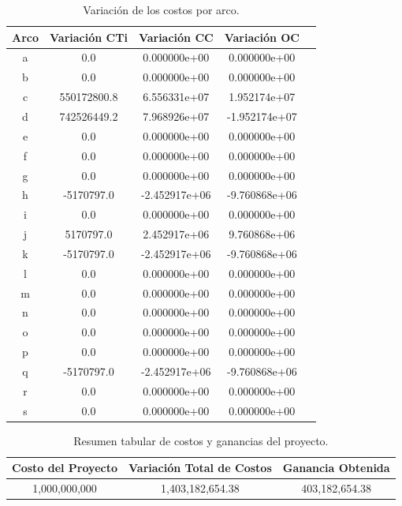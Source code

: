 \documentclass[letterpaper,12pt]{article}
\begin{document}
\begin{table}[H]
    \centering
    \begin{tabular}{ccccc}
        \toprule
        \textbf{Arco} & \textbf{Variación CTi} & \textbf{Variación CC} & \textbf{Variación OC} \\
        \midrule
        a & 0.0         & 0.000000e+00 & 0.000000e+00 \\
        b & 0.0         & 0.000000e+00 & 0.000000e+00 \\
        c & 550172800.8 & 6.556331e+07 & 1.952174e+07 \\
        d & 742526449.2 & 7.968926e+07 & -1.952174e+07 \\
        e & 0.0         & 0.000000e+00 & 0.000000e+00 \\
        f & 0.0         & 0.000000e+00 & 0.000000e+00 \\
        g & 0.0         & 0.000000e+00 & 0.000000e+00 \\
        h & -5170797.0  & -2.452917e+06 & -9.760868e+06 \\
        i & 0.0         & 0.000000e+00 & 0.000000e+00 \\
        j & 5170797.0   & 2.452917e+06 & 9.760868e+06 \\
        k & -5170797.0  & -2.452917e+06 & -9.760868e+06 \\
        l & 0.0         & 0.000000e+00 & 0.000000e+00 \\
        m & 0.0         & 0.000000e+00 & 0.000000e+00 \\
        n & 0.0         & 0.000000e+00 & 0.000000e+00 \\
        o & 0.0         & 0.000000e+00 & 0.000000e+00 \\
        p & 0.0         & 0.000000e+00 & 0.000000e+00 \\
        q & -5170797.0  & -2.452917e+06 & -9.760868e+06 \\
        r & 0.0         & 0.000000e+00 & 0.000000e+00 \\
        s & 0.0         & 0.000000e+00 & 0.000000e+00 \\
        \bottomrule
    \end{tabular}
    \caption{Variación de los costos por arco.}
    \label{tab:variacion_costos}
\end{table}


\begin{table}[H]
    \centering
    \begin{tabular}{ccc}
        \toprule
        \textbf{Costo del Proyecto} & \textbf{Variación Total de Costos} & \textbf{Ganancia Obtenida} \\
        \midrule
        1,000,000,000 & 1,403,182,654.38 & 403,182,654.38 \\
        \bottomrule
    \end{tabular}
    \caption{Resumen tabular de costos y ganancias del proyecto.}
    \label{tab:resumen_costos}
\end{table}
\end{document}
